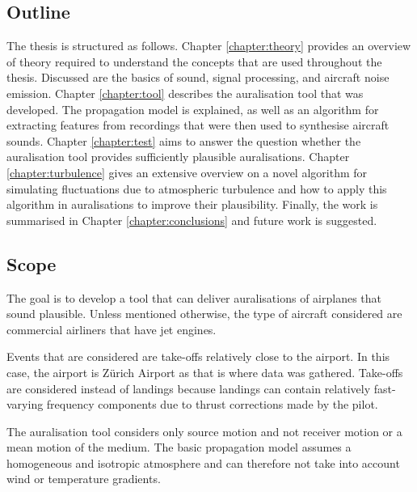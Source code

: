\subsection{Outline}
The thesis is structured as follows.
\newline
\newline
Chapter \ref{chapter:theory} provides an overview of theory required to
understand the concepts that are used throughout the thesis. Discussed are the
basics of sound, signal processing, and aircraft noise emission.
\newline
\newline
Chapter \ref{chapter:tool} describes the auralisation tool that was developed.
The propagation model is explained, as well as an algorithm for extracting
features from recordings that were then used to synthesise aircraft sounds.
\newline
\newline
Chapter \ref{chapter:test} aims to answer the question whether the auralisation
tool provides sufficiently plausible auralisations.
\newline
\newline
Chapter \ref{chapter:turbulence} gives an extensive overview on a novel
algorithm for simulating fluctuations due to atmospheric turbulence and how to
apply this algorithm in auralisations to improve their plausibility.
\newline
\newline
Finally, the work is summarised in Chapter \ref{chapter:conclusions} and future
work is suggested.


\subsection{Scope}
The goal is to develop a tool that can deliver auralisations of airplanes that
sound plausible. Unless mentioned otherwise, the type of aircraft considered are
commercial airliners that have jet engines.

Events that are considered are take-offs relatively close to the airport. In
this case, the airport is Z\"{u}rich Airport as that is where data was gathered.
Take-offs are considered instead of landings because landings can contain
relatively fast-varying frequency components due to thrust corrections made by the pilot.

The auralisation tool considers only source motion and not receiver motion
or a mean motion of the medium. The basic propagation model assumes a homogeneous
and isotropic atmosphere and can therefore not take into account wind or
temperature gradients.

%


